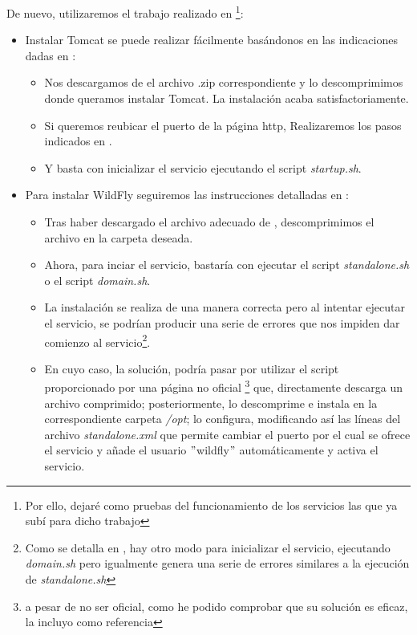 \documentclass[paper=a4, fontsize=11pt]{scrartcl} %
\numberwithin{equation}{section} %
\numberwithin{figure}{section} %
\numberwithin{table}{section} %
\begin{document}
\begin{enumerate}
		De nuevo, utilizaremos el trabajo realizado en \cite{TWG}\footnote{Por ello, dejaré como
		pruebas del funcionamiento de los servicios las que ya subí para dicho trabajo}:
		
		\begin{itemize}
			\item Instalar Tomcat se puede realizar fácilmente basándonos en las indicaciones dadas
			en \cite{TC_install}:
			
			\begin{itemize}
				\item Nos descargamos de \cite{TC_download} el archivo .zip correspondiente y lo
				descomprimimos donde queramos instalar Tomcat. La instalación acaba satisfactoriamente.
				
				\item Si queremos reubicar el puerto de la página http, Realizaremos los pasos indicados
				en \cite{TC_StackOverFlow}.
				
				\item Y basta con inicializar el servicio ejecutando el script \textit{startup.sh}.
			\end{itemize}
			
			\item Para instalar WildFly seguiremos las instrucciones detalladas en \cite{WF_install}:
			
			\begin{itemize}
				\item Tras haber descargado el archivo adecuado de \cite{WF_download}, descomprimimos
				el archivo en la carpeta deseada.
				
				\item Ahora, para inciar el servicio, bastaría con ejecutar el script
				\textit{standalone.sh} o el script \textit{domain.sh}.
				
				\item La instalación se realiza de una manera correcta pero al intentar ejecutar el
				servicio, se podrían producir una serie de errores que nos impiden dar comienzo al
				servicio\footnote{Como se detalla en \cite{WF_install}, hay otro modo para inicializar
				el servicio, ejecutando \textit{domain.sh} pero igualmente genera una serie de errores
				similares a la ejecución de \textit{standalone.sh}}.
				
				\item En cuyo caso, la solución, podría pasar por utilizar el script proporcionado por
				una página no oficial \cite{WF_solution}\footnote{a pesar de no ser oficial, como he
				podido comprobar que su solución es eficaz, la incluyo como referencia} que, directamente
				descarga un archivo comprimido; posteriormente, lo descomprime e instala en la
				correspondiente carpeta \textit{/opt}; lo configura, modificando así las líneas del
				archivo \textit{standalone.xml} que permite cambiar el puerto por el cual se ofrece el
				servicio y añade el usuario $"$wildfly$"$ automáticamente y activa el servicio.
				

\end{itemize}
\end{itemize}
\end{enumerate}
\end{document}
